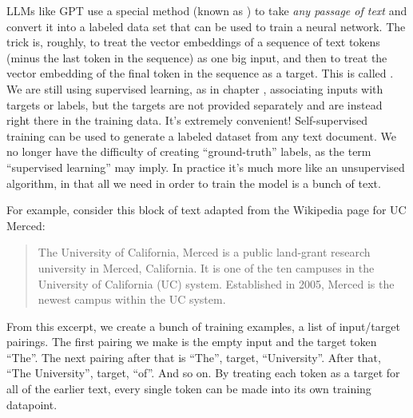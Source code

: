 LLMs like GPT use a special method (known as ) to
take \emph{any passage of text} and convert it into a labeled data set that can
be used to train a neural network. The trick is, roughly, to treat the vector
embeddings of a sequence of text tokens (minus the last token in the sequence)
as one big input, and then to treat the vector embedding of the final token in
the sequence as a target. This is called .
We are still using supervised learning, as in chapter ,
associating inputs with targets or labels, but the targets are not provided
separately and are instead right there in the training data. It's extremely
convenient! Self-supervised training can be used to generate a labeled dataset
from any text document. We no longer have the difficulty of creating
``ground-truth'' labels, as the term ``supervised learning'' may imply. In
practice it's much more like an unsupervised algorithm, in that all we need in
order to train the model is a bunch of text.

For example, consider this block of text adapted from the Wikipedia page for UC
Merced:

\begin{quote}
The University of California, Merced is a public land-grant research university
in Merced, California. It is one of the ten campuses in the University of
California (UC) system. Established in 2005, Merced is the newest campus within
the UC system.
\end{quote}

From this excerpt, we create a bunch of training examples, a list of
input/target pairings. The first pairing we make is the empty input and the
target token ``The''. The next pairing after that is ``The'', target,
``University''. After that, ``The University'', target, ``of''. And so on. By
treating each token as a target for all of the earlier text, every single token
can be made into its own training datapoint.

